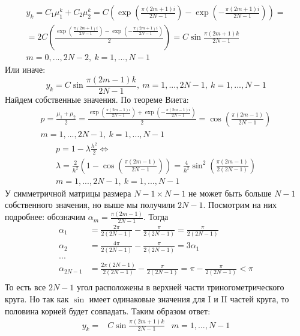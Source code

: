\documentclass[12pt]{article}
\begin{document}
\begin{enumerate}
\begin{enumerate}
\begin{multline*}
            y_k=C_1\mu_1^k+C_2\mu_2^k=C\left(\exp\left(\frac{\pi(2m+1)i}{2N-1}\right)-\exp\left(-\frac{\pi(2m+1)i}{2N-1}\right)\right)=\\
            =2C\left(\frac{\exp\left(\frac{\pi(2m+1)i}{2N-1}\right)-\exp\left(-\frac{\pi(2m+1)i}{2N-1}\right)}{2}\right) = C\sin\frac{\pi(2m+1)k}{2N-1}\\
            m=0,...,2N-2,\ k=1,...,N-1
        \end{multline*}
        Или иначе:
        \[y_k=C\sin\frac{\pi(2m-1)k}{2N-1},\ m=1,...,2N-1,\ k=1,...,N-1\]
        Найдем собственные значения. По теореме Виета:
        \begin{multline*}
            p=\frac{\mu_1+\mu_2}{2}=\frac{\exp\left(\frac{\pi(2m-1)i}{2N-1}\right) + \exp\left(-\frac{\pi(2m-1)i}{2N-1}\right)}{2}=\cos\left(\frac{\pi(2m-1)}{2N-1}\right)\\
            m=1,...,2N-1,\ k=1,...,N-1
        \end{multline*}
        \begin{multline*}
            p=1-\lambda\frac{h^2}{2}\Leftrightarrow\\\lambda=\frac{2}{h^2}\left(1-\cos\left(\frac{\pi(2m-1)}{2N-1}\right)\right)=\frac{4}{h^2}\sin^2\left(\frac{\pi(2m-1)}{2(2N-1)}\right)\\
            m=1,...,2N-1,\ k=1,...,N-1
        \end{multline*}
        У симметричной матрицы размера $N-1\times N-1$ не может быть больше $N-1$ собственного значения, но выше мы получили $2N-1$.
        Посмотрим на них подробнее: обозначим $\alpha_m=\frac{\pi(2m-1)}{2N-1}$. Тогда
        \begin{align*}
            \alpha_1 &= \frac{2\pi}{2(2N-1)} - \frac{\pi}{2(2N-1)} = \frac{\pi}{2(2N-1)} \\
            \alpha_2 &= \frac{4\pi}{2(2N-1)} - \frac{\pi}{2(2N-1)} = 3\alpha_1 \\
            ...& \\
            \alpha_{2N-1} &= \frac{2\pi(2N-1)}{2(2N-1)} - \frac{\pi}{2(2N-1)} = \pi - \frac{\pi}{2(2N-1)} < \pi \\
        \end{align*}
        То есть все $2N-1$ угол расположены в верхней части триногометрического круга.
        Но так как $\sin$ имеет одинаковые значения для I и II частей круга,
        то половина корней будет совпадать. Таким образом ответ:
        \begin{align*}
            y_k=&C\sin\frac{\pi(2m+1)k}{2N-1}  &m=1,...,N-1\\

\end{align*}
\end{enumerate}
\end{enumerate}
\end{document}
